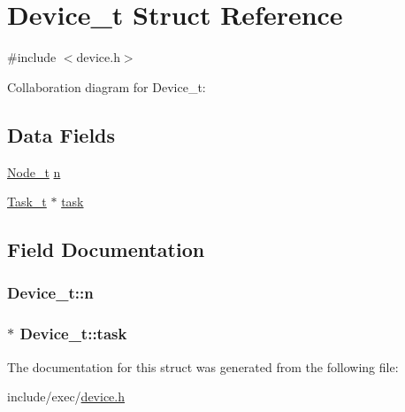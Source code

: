 \hypertarget{structDevice__t}{\section{Device\+\_\+t Struct Reference}
\label{structDevice__t}
}


{\ttfamily \#include $<$device.\+h$>$}



Collaboration diagram for Device\+\_\+t\+:
\subsection*{Data Fields}
\begin{DoxyCompactItemize}
\item 
\hyperlink{structNode__t}{Node\+\_\+t} \hyperlink{structDevice__t_ad464702fb087362efdc16543a5a9314f}{n}
\item 
\hyperlink{structTask__t}{Task\+\_\+t} $\ast$ \hyperlink{structDevice__t_a386bd32231aa7efca30c3e1a03cfa7f4}{task}
\end{DoxyCompactItemize}


\subsection{Field Documentation}
\hypertarget{structDevice__t_ad464702fb087362efdc16543a5a9314f}{
\subsubsection[{n}]{ Device\+\_\+t\+::n}}\label{structDevice__t_ad464702fb087362efdc16543a5a9314f}
\hypertarget{structDevice__t_a386bd32231aa7efca30c3e1a03cfa7f4}{
\subsubsection[{task}]{$\ast$ Device\+\_\+t\+::task}}\label{structDevice__t_a386bd32231aa7efca30c3e1a03cfa7f4}


The documentation for this struct was generated from the following file\+:\begin{DoxyCompactItemize}
\item 
include/exec/\hyperlink{device_8h}{device.\+h}\end{DoxyCompactItemize}
